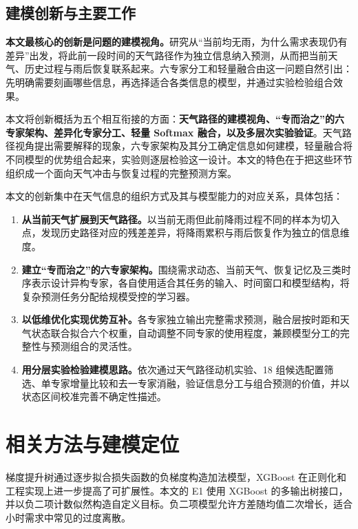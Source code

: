 \documentclass[UTF8,11pt,a4paper]{ctexart}
\begin{document}
\subsection{建模创新与主要工作}

\textbf{本文最核心的创新是问题的建模视角。}研究从“当前均无雨，为什么需求表现仍有差异”出发，将此前一段时间的天气路径作为独立信息纳入预测，从而把当前天气、历史过程与雨后恢复联系起来。六专家分工和轻量融合由这一问题自然引出：先明确需要刻画哪些信息，再选择适合各类信息的模型，并通过实验检验组合效果。

本文将创新概括为五个相互衔接的方面：\textbf{天气路径的建模视角、“专而治之”的六专家架构、差异化专家分工、轻量 Softmax 融合，以及多层次实验验证}。天气路径视角提出需要解释的现象，六专家架构及其分工确定信息如何建模，轻量融合将不同模型的优势组合起来，实验则逐层检验这一设计。本文的特色在于把这些环节组织成一个面向天气冲击与恢复过程的完整预测方案。

本文的创新集中在天气信息的组织方式及其与模型能力的对应关系，具体包括：
\begin{enumerate}
  \item \textbf{从当前天气扩展到天气路径。}以当前无雨但此前降雨过程不同的样本为切入点，发现历史路径对应的残差差异，将降雨累积与雨后恢复作为独立的信息维度。
  \item \textbf{建立“专而治之”的六专家架构。}围绕需求动态、当前天气、恢复记忆及三类时序表示设计异构专家，各自使用适合其任务的输入、时间窗口和模型结构，将复杂预测任务分配给规模受控的学习器。
  \item \textbf{以低维优化实现优势互补。}各专家独立输出完整需求预测，融合层按时距和天气状态联合拟合六个权重，自动调整不同专家的使用程度，兼顾模型分工的完整性与预测组合的灵活性。
  \item \textbf{用分层实验检验建模思路。}依次通过天气路径动机实验、18 组候选配置筛选、单专家增量比较和去一专家消融，验证信息分工与组合预测的价值，并以状态区间校准完善不确定性描述。
\end{enumerate}

\section{相关方法与建模定位}

梯度提升树通过逐步拟合损失函数的负梯度构造加法模型\cite{friedman2001}，XGBoost 在正则化和工程实现上进一步提高了可扩展性\cite{chen2016}。本文的 E1 使用 XGBoost 的多输出树接口，并以负二项计数似然构造自定义目标。负二项模型允许方差随均值二次增长，适合小时需求中常见的过度离散\cite{cameron2013}。
\end{document}
